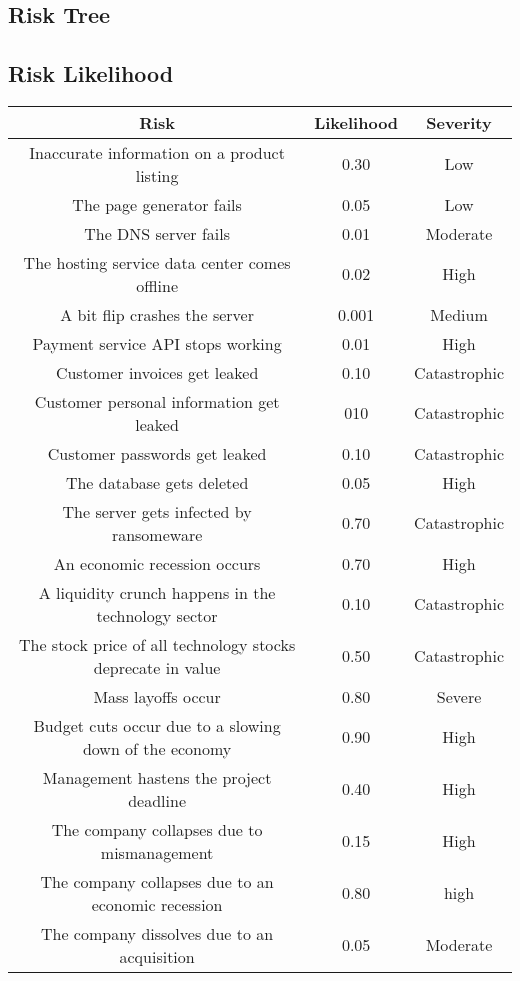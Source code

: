 \subsection{Risk Tree}
\subsection{Risk Likelihood}
\begin{tabular}{|c|c|c|}
  \hline
  Risk&Likelihood&Severity\\
  \hline
  Inaccurate information on a product listing&0.30&Low\\
  \hline
  The page generator fails&0.05&Low\\
  \hline
  The DNS server fails&0.01&Moderate\\
  \hline
  The hosting service data center comes offline&0.02&High\\
  \hline
  A bit flip crashes the server&0.001&Medium\\
  \hline
  Payment service API stops working&0.01&High\\
  \hline
  Customer invoices get leaked&0.10&Catastrophic\\
  \hline
  Customer personal information get leaked&010&Catastrophic\\
  \hline
  Customer passwords get leaked&0.10&Catastrophic\\
  \hline
  The database gets deleted&0.05&High\\
  \hline
  The server gets infected by ransomeware&0.70&Catastrophic\\
  \hline
  An economic recession occurs&0.70&High\\
  \hline
  A liquidity crunch happens in the technology sector&0.10&Catastrophic\\
  \hline
  The stock price of all technology stocks deprecate in value&0.50&Catastrophic\\
  \hline
  Mass layoffs occur&0.80&Severe\\
  \hline
  Budget cuts occur due to a slowing down of the economy&0.90&High\\
  \hline
  Management hastens the project deadline&0.40&High\\
  \hline
  The company collapses due to mismanagement&0.15&High\\
  \hline
  The company collapses due to an economic recession&0.80&high\\
  \hline
  The company dissolves due to an acquisition&0.05&Moderate\\
  \hline
\end{tabular}
